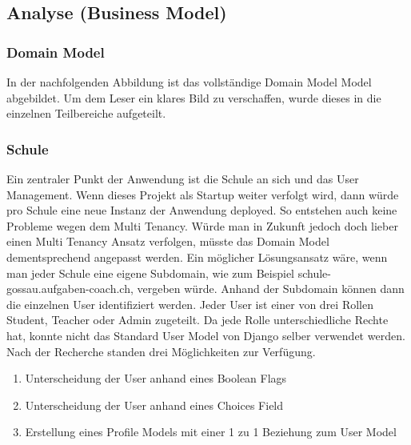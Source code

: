 \subsection{Analyse (Business Model)}
\subsubsection{Domain Model}
In der nachfolgenden Abbildung ist das vollständige Domain Model Model abgebildet. Um dem Leser ein klares Bild zu verschaffen, wurde dieses in die einzelnen Teilbereiche aufgeteilt.

\subsubsection*{Schule}
Ein zentraler Punkt der Anwendung ist die Schule an sich und das User Management. Wenn dieses Projekt als Startup weiter verfolgt wird, dann würde pro Schule eine neue Instanz der Anwendung deployed. So entstehen auch keine Probleme wegen dem Multi Tenancy. Würde man in Zukunft jedoch doch lieber einen Multi Tenancy Ansatz verfolgen, müsste das Domain Model dementsprechend angepasst werden. Ein möglicher Lösungsansatz wäre, wenn man jeder Schule eine eigene Subdomain, wie zum Beispiel schule-gossau.aufgaben-coach.ch, vergeben würde. Anhand der Subdomain können dann die einzelnen User identifiziert werden.
Jeder User ist einer von drei Rollen Student, Teacher oder Admin zugeteilt. Da jede Rolle unterschiedliche Rechte hat, konnte nicht das Standard User Model von Django selber verwendet werden. Nach der Recherche standen drei Möglichkeiten zur Verfügung.

\begin{enumerate}
	\item Unterscheidung der User anhand eines Boolean Flags
	\item Unterscheidung der User anhand eines Choices Field 
	\item Erstellung eines Profile Models mit einer 1 zu 1 Beziehung zum User Model
\end{enumerate}

